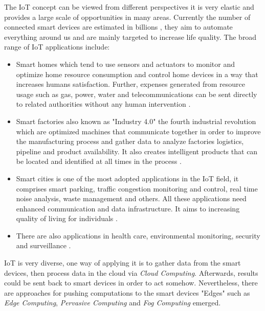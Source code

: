 \noindent The IoT concept can be viewed from different perspectives it is very elastic and provides a large scale of opportunities in many areas. Currently the number of connected smart devices are estimated in billions \cite{connecteddevices}, they aim to automate everything around us and are mainly targeted to increase life quality. The broad range of IoT applications include:
\begin{itemize}
\item Smart homes which tend to use sensors and actuators to monitor and optimize home resource consumption and control home devices in a way that increases humans satisfaction. Further, expenses generated from resource usage such as gas, power, water and telecommunications can be sent directly to related authorities without any human intervention \cite{Chan:2008:RSH:1377032.1377113}.  
\item Smart factories also known as "Industry 4.0" the fourth industrial revolution which are optimized machines that communicate together in order to improve the manufacturing process and gather data to analyze factories logistics, pipeline and product availability. It also creates intelligent products that can be located and identified at all times in the process \cite{Gilchrist:2016:III:2994178}.

\item Smart cities is one of the most adopted applications in the IoT field, it comprises smart parking, traffic congestion monitoring and control, real time noise analysis, waste management and others.  All these applications need enhanced communication and data infrastructure. It aims to increasing quality of living for individuals \cite{6740844}. 

\item There are also applications in  health care, environmental monitoring, security and surveillance \cite{Li:2015:ITS:2750609.2750625}.
\end{itemize}

\noindent IoT is very diverse, one way of applying it is to gather data from the smart devices, then process data in the cloud via \textit{Cloud Computing}. Afterwards, results could be sent back to smart devices in order to act somehow. Nevertheless, there are approaches for pushing computations to the smart devices "Edges"  such as 
\textit{Edge Computing}, \textit{Pervasive Computing} and \textit{Fog Computing} emerged.



